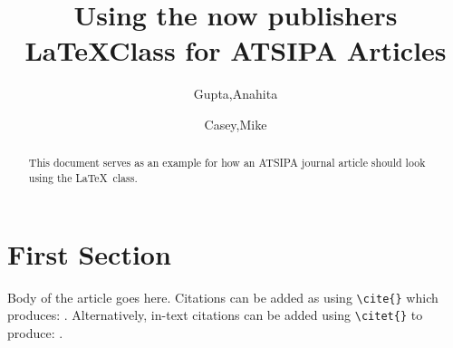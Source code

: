 \documentclass[sip,biber]{now-journal} %
\title{Using the now publishers \LaTeX Class for ATSIPA Articles}
\author[1*]{Gupta,Anahita}
\author[1]{Casey,Mike}
\affil[1]{now publishers, Inc.}
\begin{document}
\begin{abstract}
This document serves as an example for how an ATSIPA journal article should look using the \LaTeX\ class.
\end{abstract}

\section{First Section}
\label{s-section1}

Body of the article goes here. Citations can be added as using \texttt{\textbackslash cite\{\}} which produces: \cite{armonth}. Alternatively, in-text citations can be added using \texttt{\textbackslash citet\{\}} to produce: \citet{bvolume}.

\printbibliography
\end{document}
